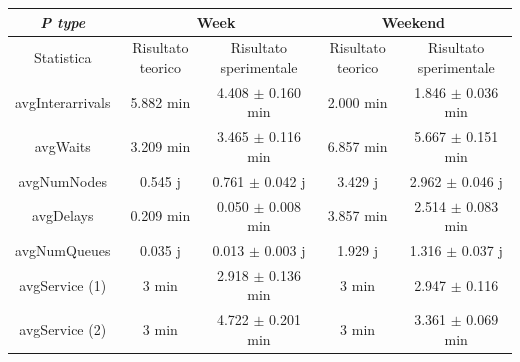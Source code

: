 \documentclass[a4paper, 12pt]{article}
\begin{document}
\begin{adjustbox}{width=\textwidth}
\centering
\begin{tabular}{ |c|c|c|c|c| }
\hline
\cellcolor{cellcolor} \textit{P type} & \multicolumn{2}{|c|}{\cellcolor{cellcolor}Week} & \multicolumn{2}{|c|}{\cellcolor{cellcolor}Weekend} \\
\hline
\cellcolor{cellcolor}Statistica & \cellcolor{cellcolor}Risultato teorico & \cellcolor{cellcolor}Risultato sperimentale & \cellcolor{cellcolor}Risultato teorico & \cellcolor{cellcolor}Risultato sperimentale \\
\hline
\hline
avgInterarrivals & 5.882 min & 4.408 $\pm$ 0.160 min & 2.000 min & 1.846 $\pm$ 0.036 min \\
\hline
avgWaits & 3.209 min & 3.465 $\pm$ 0.116 min &  6.857 min & 5.667 $\pm$ 0.151 min \\
\hline
avgNumNodes & 0.545 j & 0.761 $\pm$ 0.042 j & 3.429 j & 2.962 $\pm$ 0.046 j \\
\hline
avgDelays & 0.209 min & 0.050 $\pm$ 0.008 min & 3.857 min & 2.514 $\pm$ 0.083 min \\
\hline
avgNumQueues & 0.035 j & 0.013 $\pm$ 0.003 j & 1.929 j & 1.316 $\pm$ 0.037 j \\
\hline
avgService (1) & 3 min & 2.918 $\pm$ 0.136 min & 3 min & 2.947 $\pm$ 0.116 \\
\hline
avgService (2) & 3 min & 4.722 $\pm$ 0.201 min & 3 min & 3.361 $\pm$ 0.069 min \\
\hline

\end{tabular}
\end{adjustbox}
\bigskip
\end{document}
